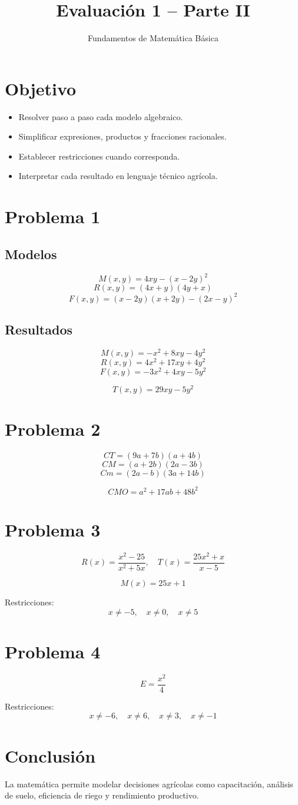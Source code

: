 \documentclass[12pt]{article}
\title{Evaluación 1 -- Parte II}
\author{Fundamentos de Matemática Básica}
\date{}
\begin{document}
	
	\maketitle
	
	\section*{Objetivo}
	\begin{itemize}
		\item Resolver paso a paso cada modelo algebraico.
		\item Simplificar expresiones, productos y fracciones racionales.
		\item Establecer restricciones cuando corresponda.
		\item Interpretar cada resultado en lenguaje técnico agrícola.
	\end{itemize}
	
	\section*{Problema 1}
	\subsection*{Modelos}
	\[
	M(x,y)=4xy-(x-2y)^2
	\]
	\[
	R(x,y)=(4x+y)(4y+x)
	\]
	\[
	F(x,y)=(x-2y)(x+2y)-(2x-y)^2
	\]
	
	\subsection*{Resultados}
	\[
	M(x,y)=-x^2+8xy-4y^2
	\]
	\[
	R(x,y)=4x^2+17xy+4y^2
	\]
	\[
	F(x,y)=-3x^2+4xy-5y^2
	\]
	
	\[
	T(x,y)=29xy-5y^2
	\]
	
	\section*{Problema 2}
	\[
	CT=(9a+7b)(a+4b)
	\]
	\[
	CM=(a+2b)(2a-3b)
	\]
	\[
	Cm=(2a-b)(3a+14b)
	\]
	
	\[
	CMO=a^2+17ab+48b^2
	\]
	
	\section*{Problema 3}
	\[
	R(x)=\frac{x^2-25}{x^2+5x}, \quad
	T(x)=\frac{25x^2+x}{x-5}
	\]
	
	\[
	M(x)=25x+1
	\]
	
	Restricciones:
	\[
	x \neq -5, \quad x \neq 0, \quad x \neq 5
	\]
	
	\section*{Problema 4}
	\[
	E=\frac{x^2}{4}
	\]
	
	Restricciones:
	\[
	x \neq -6, \quad x \neq 6, \quad x \neq 3, \quad x \neq -1
	\]
	
	\section*{Conclusión}
	La matemática permite modelar decisiones agrícolas como capacitación, análisis de suelo, eficiencia de riego y rendimiento productivo.
	
\end{document}
